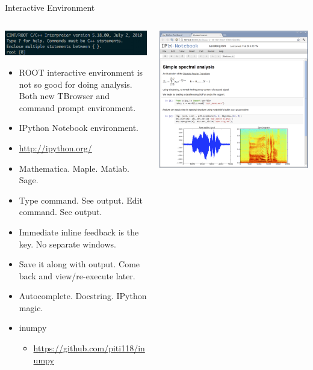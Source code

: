 \documentclass{beamer}
\begin{document}
\begin{frame}[fragile, shrink=5]{Interactive Environment}
	\fontsize{10}{10}\selectfont
	\begin{columns}
	\begin{column}{0.5\textwidth}
		\includegraphics[width=\textwidth]{pic/cint.png}
		\begin{itemize}
		\item ROOT interactive environment is not so good for doing analysis. Both new TBrowser and command prompt environment.
		\item IPython Notebook environment. 
		\item \url{http://ipython.org/}
		\item Mathematica. Maple. Matlab. Sage.
		\item Type command. See output. Edit command. See output.
		\item Immediate inline feedback is the key. No separate windows.
		\item Save it along with output. Come back and view/re-execute later.
		\item Autocomplete. Docstring. IPython magic.
		\item inumpy
			\begin{itemize}
				\item \tiny \url{https://github.com/piti118/inumpy}
			\end{itemize}
		\end{itemize}		
	\end{column}
	\begin{column}{0.5\textwidth}
		\includegraphics[width=\textwidth]{pic/ipy-notebook-spectral.png}\\

\end{column}
\end{columns}
\end{frame}
\end{document}
